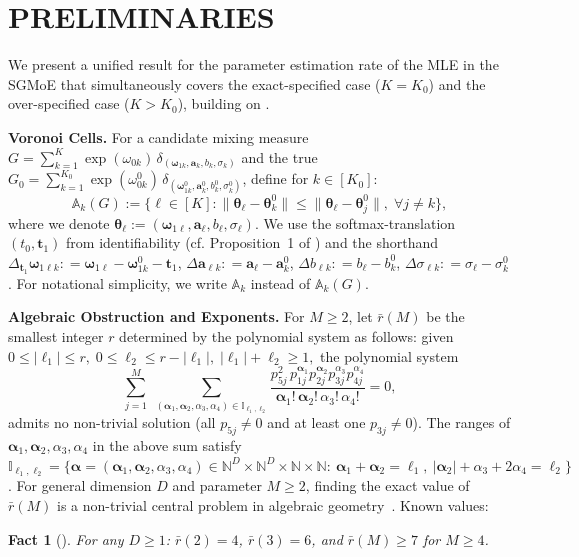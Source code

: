 \documentclass[twoside]{article}
\theoremstyle{plain}
\newtheorem{fact}{Fact}
\theoremstyle{definition}
\theoremstyle{plain}
\def\vtheta{{\bm{\theta}}}
\def\valpha{{\bm{\alpha}}}
\def\vomega{{\bm{\omega}}}
\def\vell{{\bm{\ell}}}
\def\va{{\bm{a}}}
\def\vt{{\bm{t}}}
\def\sA{{\mathbb{A}}}
\def\sI{{\mathbb{I}}}
\newcommand{\Ns}{\mathbb{N}} %
\newcommand{\norm}[1]{\|#1\|}
\begin{document}
\section{PRELIMINARIES}
\label{sec_preliminaries}

We present a unified result for the parameter estimation rate of the MLE in the SGMoE that simultaneously covers the exact-specified case ($K=K_0$) and the over-specified case ($K>K_0$), building on \cite{nguyen_demystifying_2023}.

{\bf Voronoi Cells.}
For a candidate mixing measure $G=\sum_{k=1}^{K}\exp(\omega_{0k})\,\delta_{(\vomega_{1k},\va_k,b_k,\sigma_k)}$ and the true $G_0=\sum_{k=1}^{K_0}\exp(\omega^0_{0k})\,\delta_{(\vomega^0_{1k},\va^0_k,b^0_k,\sigma^0_k)}$, define for $k\in [K_0]$:
\begin{equation}
    \sA_k (G) := \{ \ell \in [K] : \norm{\vtheta_{\ell} - \vtheta^0_{k}} \leq \norm{\vtheta_{\ell} - \vtheta^0_{j}},\; \forall j \ne k \},\label{eq_voronoi_cell}
\end{equation}
where we denote $\vtheta_{\ell} := (\vomega_{1\ell}, \va_{\ell}, b_{\ell}, \sigma_{\ell}) $.
We use the softmax-translation $(t_0,\vt_1)$ from identifiability (cf. Proposition~1 of \citealp{nguyen_demystifying_2023}) and the shorthand $\Delta_{\vt_{1}} \vomega_{1\ell k} : = \vomega_{1\ell} - \vomega_{1k}^{0} - \vt_{1}$, $\Delta \va_{\ell k} : = \va_{\ell} - \va_{k}^{0}$, $\Delta b_{\ell k} : = b_{\ell} - b_{k}^{0}$, $\Delta \sigma_{\ell k} : = \sigma_{\ell} - \sigma_{k}^{0}$. For notational simplicity, we write $\sA_k$ instead of $\sA_k(G)$.

{\bf Algebraic Obstruction and Exponents.}
For $M\ge2$, let $\bar r(M)$ be the smallest integer $r$ determined by the polynomial system as follows: given $0\le|\vell_1|\le r,\;0\le \ell_2\le r-|\vell_1|,\;|\vell_1|+\ell_2\ge1,$ the polynomial system
\begin{equation}
\sum_{j=1}^{M}\;
\sum_{(\valpha_1,\valpha_2,\alpha_3,\alpha_4)\in\sI_{\vell_1,\ell_2}}
\frac{p_{5j}^2\,p_{1j}^{\valpha_1} p_{2j}^{\valpha_2} p_{3j}^{\alpha_3} p_{4j}^{\alpha_4}}
{\valpha_1!\,\valpha_2!\,\alpha_3!\,\alpha_4!}=0,
\label{eq_system_of_polynomial_recall}
\end{equation}
admits no non-trivial solution (all $p_{5j}\neq0$ and at least one $p_{3j}\neq0$). The ranges of $\valpha_{1}, \valpha_{2}, \alpha_{3}, \alpha_{4}$ in the above sum satisfy $\sI_{\vell_1, \ell_{2}} = \{\valpha = (\valpha_{1}, \valpha_{2}, \alpha_{3}, \alpha_{4}) \in \Ns^{D} \times \Ns^{D} \times \Ns \times \Ns: \ \valpha_{1} + \valpha_{2} = \vell_1, \ |\valpha_{2}| + \alpha_{3} + 2 \alpha_{4} = \ell_{2}\}$. For general dimension $D$ and parameter $M \geq 2$, finding the exact value of $\bar{r}(M)$ is a non-trivial central problem in algebraic geometry~\citep{sturmfels_solving_2002}. Known values:
\begin{fact}[{\citealp[Lemma 1]{nguyen_demystifying_2023}}]\label{lemma:value_r_unified}
For any $D\ge1$: $\bar r(2)=4$, $\bar r(3)=6$, and $\bar r(M)\ge7$ for $M\ge4$.
\end{fact}
\end{document}
